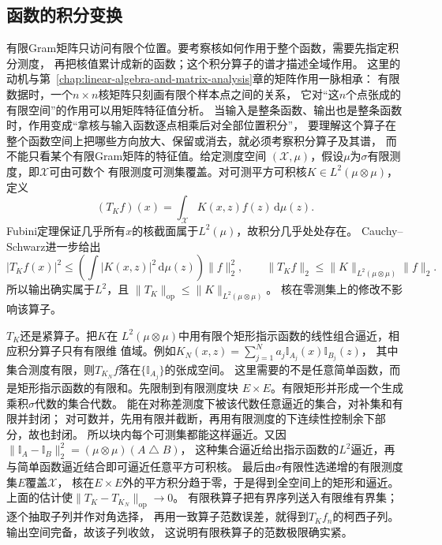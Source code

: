\subsection{函数的积分变换}
\label{sec:functional-integral-transforms}
\label{sec:functional-kernel-spectrum-regularization}

有限Gram矩阵只访问有限个位置。要考察核如何作用于整个函数，需要先指定积分测度，
再把核值累计成新的函数；这个积分算子的谱才描述全域作用。
这里的动机与第~\ref{chap:linear-algebra-and-matrix-analysis}章的矩阵作用一脉相承：
有限数据时，一个$n\times n$核矩阵只刻画有限个样本点之间的关系，
它对“这$n$个点张成的有限空间”的作用可以用矩阵特征值分析。
当输入是整条函数、输出也是整条函数时，作用变成“拿核与输入函数逐点相乘后对全部位置积分”，
要理解这个算子在整个函数空间上把哪些方向放大、保留或消去，就必须考察积分算子及其谱，
而不能只看某个有限Gram矩阵的特征值。给定测度空间
$(\mathcal X,\mu)$，假设$\mu$为$\sigma$有限测度，即$\mathcal X$可由可数个
有限测度可测集覆盖。对可测平方可积核$K\in L^2(\mu\otimes\mu)$，定义
\begin{equation}
 (T_Kf)(x)=\int_{\mathcal X}K(x,z)f(z)\,\mathrm d\mu(z).
 \label{eq:functional-kernel-integral-operator}
\end{equation}
Fubini定理保证几乎所有$x$的核截面属于$L^2(\mu)$，故积分几乎处处存在。
Cauchy--Schwarz进一步给出
\[
 |T_Kf(x)|^2
 \leq\left(\int|K(x,z)|^2\,\mathrm d\mu(z)\right)\lVert f\rVert_2^2,\qquad
 \lVert T_Kf\rVert_2\leq\lVert K\rVert_{L^2(\mu\otimes\mu)}\lVert f\rVert_2.
\]
所以输出确实属于$L^2$，且
$\lVert T_K\rVert_{\mathrm{op}}\leq\lVert K\rVert_{L^2(\mu\otimes\mu)}$。
核在零测集上的修改不影响该算子。

$T_K$还是紧算子。把$K$在
$L^2(\mu\otimes\mu)$中用有限个矩形指示函数的线性组合逼近，相应积分算子只有有限维
值域。例如$K_N(x,z)=\sum_{j=1}^N a_j\mathbb I_{A_j}(x)\mathbb I_{B_j}(z)$，
其中集合测度有限，则$T_{K_N}f$落在$\{\mathbb I_{A_j}\}$的张成空间。
这里需要的不是任意简单函数，而是矩形指示函数的有限和。先限制到有限测度块
$E\times E$。有限矩形并形成一个生成乘积$\sigma$代数的集合代数。
能在对称差测度下被该代数任意逼近的集合，对补集和有限并封闭；
对可数并，先用有限并截断，再用有限测度的下连续性控制余下部分，故也封闭。
所以块内每个可测集都能这样逼近。又因
$\lVert\mathbb I_A-\mathbb I_B\rVert_2^2=(\mu\otimes\mu)(A\mathbin\triangle B)$，
这种集合逼近给出指示函数的$L^2$逼近，再与简单函数逼近结合即可逼近任意平方可积核。
最后由$\sigma$有限性选递增的有限测度集$E$覆盖$\mathcal X$，
核在$E\times E$外的平方积分趋于零，于是得到全空间上的矩形和逼近。
上面的估计使$\lVert T_K-T_{K_N}\rVert_{\mathrm{op}}\to0$。
有限秩算子把有界序列送入有限维有界集；逐个抽取子列并作对角选择，
再用一致算子范数误差，就得到$T_Kf_n$的柯西子列。输出空间完备，故该子列收敛，
这说明有限秩算子的范数极限确实紧。

